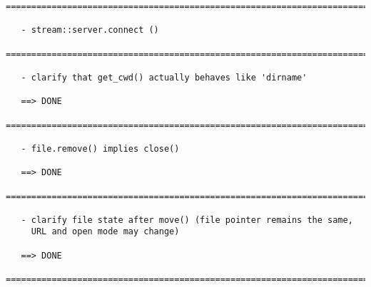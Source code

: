\documentclass{article}
\begin{document}
\begin{verbatim}
=========================================================================

   - stream::server.connect ()

=========================================================================

   - clarify that get_cwd() actually behaves like 'dirname'

   ==> DONE

=========================================================================

   - file.remove() implies close()

   ==> DONE

=========================================================================

   - clarify file state after move() (file pointer remains the same,
     URL and open mode may change)

   ==> DONE

=========================================================================

    
\end{verbatim}
\end{document}
